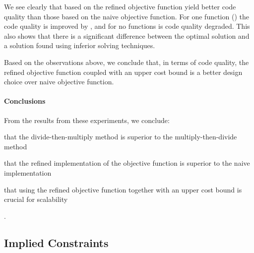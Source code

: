 We see clearly that  based on the refined
\gls{objective function} yield better code quality than those based on the naive
\gls{objective function}.
%
For one \gls{function} () the code quality is improved by
\printSpeedup{%
  \ObjFunRefinedVsNaiveCyclesSpeedupRefinedVsNaiveWLbUbCyclesZeroCenteredSpeedupMax%
}, and for no \glspl{function} is code quality degraded.
%
This also shows that there is a significant difference between the optimal
\gls{solution} and a \gls{solution} found using inferior solving techniques.

Based on the observations above, we conclude that, in terms of code quality, the
refined \gls{objective function} coupled with an upper cost bound is a better
design choice over naive \gls{objective function}.


\paragraph{Conclusions}

From the results from these experiments, we conclude:
%
\begin{enumerate*}[label=(\roman*), itemjoin={;\ }, itemjoin*={; and\ }]
  \item that the \gls{divide-then-multiply method} is superior to the
    \gls{multiply-then-divide method}
  \item that the refined implementation of the \gls{objective function} is
    superior to the naive implementation
  \item that using the refined \gls{objective function} together with an upper
    cost bound is crucial for scalability
\end{enumerate*}.


\subsection{Implied Constraints}



